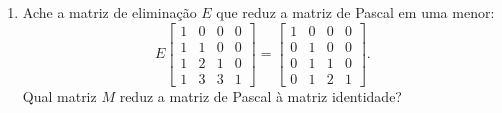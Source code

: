 \documentclass[leqno]{article}
\begin{document}
	\begin{enumerate}
		
		\item Ache a matriz de eliminação $E$ que reduz a matriz de Pascal em uma menor:
		$$E \begin{bmatrix} 
			1 & 0 & 0 & 0 \\
			1 & 1 & 0 & 0 \\
			1 & 2 & 1 & 0 \\
			1 & 3 & 3 & 1
		\end{bmatrix} = 
		\begin{bmatrix} 
			1 & 0 & 0 & 0 \\
			0 & 1 & 0 & 0 \\
			0 & 1 & 1 & 0 \\
			0 & 1 & 2 & 1 
		\end{bmatrix}.$$
		Qual matriz $M$ reduz a matriz de Pascal à matriz identidade?
		

\end{enumerate}
\end{document}
